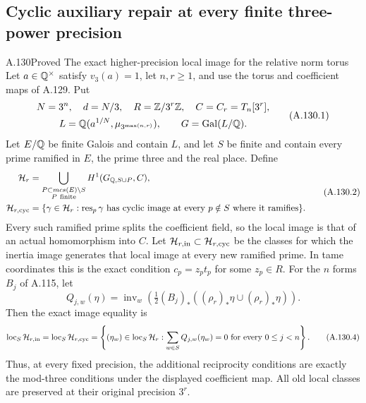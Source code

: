 \subsection{Cyclic auxiliary repair at every finite three-power precision}

\begin{statement}{A.130}{Proved}
{The exact higher-precision local image for the relative norm torus}
Let \(a\in\mathbb Q^\times\) satisfy \(v_3(a)=1\), let \(n,r\ge1\),
and use the torus and coefficient maps of A.129.  Put
\[
 \begin{gathered}
 N=3^n,\quad d=N/3,\quad R=\mathbb Z/3^r\mathbb Z,\quad C=C_r=T_n[3^r],\\
 L=\mathbb Q(a^{1/N},\mu_{3^{\max(n,r)}}),\qquad
                      G=\operatorname{Gal}(L/\mathbb Q).
 \end{gathered}
 \tag{A.130.1}
\]
Let \(E/\mathbb Q\) be finite Galois and contain \(L\), and let
\(S\) be finite and contain every prime ramified in \(E\),
the prime three and the real place.  Define
\[
 \begin{split}
 \mathcal H_r&=\bigcup_{\substack{P\subset{
m cs}(E)\setminus S\\
                                  P\ {\rm finite}}}
                         H^1(G_{\mathbb Q,S\cup P},C),\\
 \mathcal H_{r,\rm cyc}&=\{\gamma\in\mathcal H_r:
       \operatorname{res}_p\gamma\text{ has cyclic image at every}
                        \ p\notin S\text{ where it ramifies}\}.
 \end{split}
 \tag{A.130.2}
\]
Every such ramified prime splits the coefficient field, so
the local image is that of an actual homomorphism into \(C\).
Let \(\mathcal H_{r,\rm in}\subset\mathcal H_{r,\rm cyc}\)
be the classes for which the inertia image generates that
local image at every new ramified prime.  In tame coordinates
this is the exact condition \(c_p=z_pt_p\) for some \(z_p\in R\).
For the \(n\) forms \(B_j\) of A.115, let
\[
 Q_{j,w}(\eta)=\operatorname{inv}_w\!\left(
       \tfrac12(B_j)_*((\rho_r)_*\eta\cup(\rho_r)_*\eta)\right).
 \tag{A.130.3}
\]
Then the exact image equality is
\[
 \operatorname{loc}_S\mathcal H_{r,\rm in}
   =\operatorname{loc}_S\mathcal H_{r,\rm cyc}
   =\left\{(\eta_w)\in\operatorname{loc}_S\mathcal H_r:
           \sum_{w\in S}Q_{j,w}(\eta_w)=0
                                  \text{ for every }0\le j<n\right\}.
 \tag{A.130.4}
\]
Thus, at every fixed precision, the additional reciprocity
conditions are exactly the mod-three conditions under the
displayed coefficient map.  All old local classes are
preserved at their original precision \(3^r\).


\end{statement}
